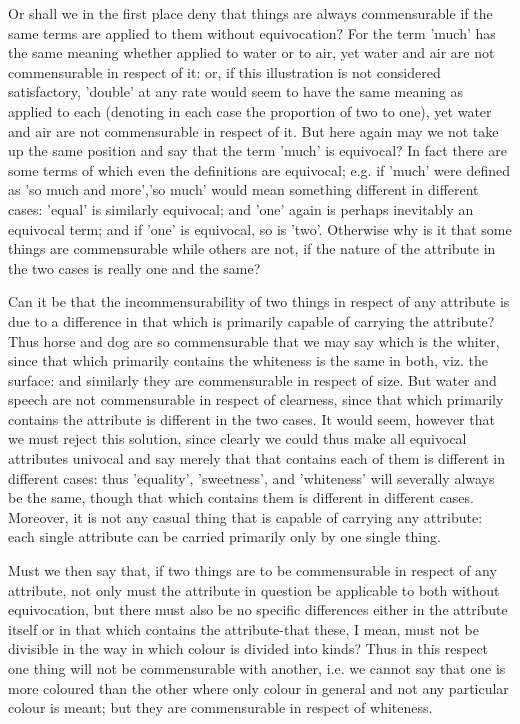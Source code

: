 Or shall we in the first place deny that things are always commensurable
if the same terms are applied to them without equivocation? For the
term 'much' has the same meaning whether applied to water or to air,
yet water and air are not commensurable in respect of it: or, if this
illustration is not considered satisfactory, 'double' at any rate
would seem to have the same meaning as applied to each (denoting in
each case the proportion of two to one), yet water and air are not
commensurable in respect of it. But here again may we not take up
the same position and say that the term 'much' is equivocal? In fact
there are some terms of which even the definitions are equivocal;
e.g. if 'much' were defined as 'so much and more','so much' would
mean something different in different cases: 'equal' is similarly
equivocal; and 'one' again is perhaps inevitably an equivocal term;
and if 'one' is equivocal, so is 'two'. Otherwise why is it that some
things are commensurable while others are not, if the nature of the
attribute in the two cases is really one and the same? 

Can it be that the incommensurability of two things in respect of
any attribute is due to a difference in that which is primarily capable
of carrying the attribute? Thus horse and dog are so commensurable
that we may say which is the whiter, since that which primarily contains
the whiteness is the same in both, viz. the surface: and similarly
they are commensurable in respect of size. But water and speech are
not commensurable in respect of clearness, since that which primarily
contains the attribute is different in the two cases. It would seem,
however that we must reject this solution, since clearly we could
thus make all equivocal attributes univocal and say merely that that
contains each of them is different in different cases: thus 'equality',
'sweetness', and 'whiteness' will severally always be the same, though
that which contains them is different in different cases. Moreover,
it is not any casual thing that is capable of carrying any attribute:
each single attribute can be carried primarily only by one single
thing. 

Must we then say that, if two things are to be commensurable in respect
of any attribute, not only must the attribute in question be applicable
to both without equivocation, but there must also be no specific differences
either in the attribute itself or in that which contains the attribute-that
these, I mean, must not be divisible in the way in which colour is
divided into kinds? Thus in this respect one thing will not be commensurable
with another, i.e. we cannot say that one is more coloured than the
other where only colour in general and not any particular colour is
meant; but they are commensurable in respect of whiteness.

